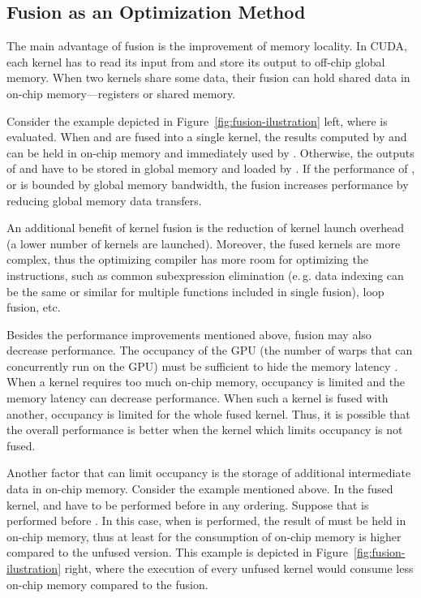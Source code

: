 \documentclass[final]{siamltex}
\def\eg{e.\,g.}
\begin{document}
\subsection{Fusion as an Optimization Method}

The main advantage of fusion is the improvement of memory locality. In CUDA, each kernel has to read its input from and store its output to off-chip global memory. When two kernels share some data, their fusion can hold shared data in on-chip memory---registers or shared memory. 

Consider the example depicted in Figure~\ref{fig:fusion-ilustration} left, where  is evaluated. When  and  are fused into a single kernel, the results computed by  and  can be held in on-chip memory and immediately used by . Otherwise, the outputs of  and  have to be stored in global memory and loaded by . If the performance of ,  or  is bounded by global memory bandwidth, the fusion increases performance by reducing global memory data transfers.

An additional benefit of kernel fusion is the reduction of kernel launch overhead (a lower number of kernels are launched). Moreover, the fused kernels are more complex, thus the optimizing compiler has more room for optimizing the instructions, such as common subexpression elimination (\eg{} data indexing can be the same or similar for multiple functions included in single fusion), loop fusion, etc.

Besides the performance improvements mentioned above, fusion may also decrease performance. The occupancy of the GPU (the number of warps that can concurrently run on the GPU) must be sufficient to hide the memory latency \cite{nvidia2011nvidia}. When a kernel requires too much on-chip memory, occupancy is limited and the memory latency can decrease performance. When such a kernel is fused with another, occupancy is limited for the whole fused kernel. Thus, it is possible that the overall performance is better when the kernel which limits occupancy is not fused.

Another factor that can limit occupancy is the storage of additional intermediate data in on-chip memory. Consider the example mentioned above. In the fused kernel,  and  have to be performed before  in any ordering. Suppose that  is performed before . In this case, when  is performed, the result of  must be held in on-chip memory, thus at least for  the consumption of on-chip memory is higher compared to the unfused version. This example is depicted in Figure~\ref{fig:fusion-ilustration} right, where the execution of every unfused kernel would consume less on-chip memory compared to the fusion.
\end{document}
